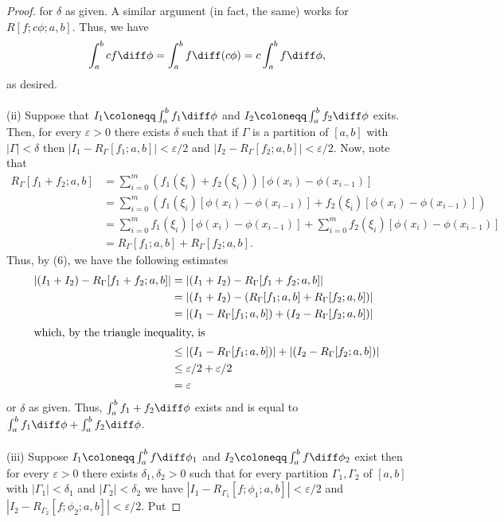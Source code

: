 \begin{proof}
for $\delta$ as given. A similar argument (in fact, the same) works for
$R[f;c\phi;a,b]$. Thus, we have
\[
\int_a^bcf\diff\phi=\int_a^bf\diff(c\phi)=c\int_a^bf\diff\phi,
\]
as desired.
\\\\
(ii) Suppose that $I_1\coloneqq \int_a^b f_1\diff\phi$ and
$I_2\coloneqq\int_a^b f_2\diff\phi$ exits. Then, for every $\varepsilon>0$
there exists $\delta$ such that if $\Gamma$ is a partition of $[a,b]$ with
$|\Gamma|<\delta$ then $\left|I_1-R_\Gamma[f_1;a,b]\right|<\varepsilon/2$
and $\left|I_2-R_\Gamma[f_2;a,b]\right|<\varepsilon/2$. Now, note that
\begin{align}
\label{eq:6}
R_\Gamma[f_1+f_2;a,b]
&=\sum_{i=0}^m(f_1(\xi_i)+f_2(\xi_i))\left[\phi(x_i)-\phi(x_{i-1})\right]\nonumber\\
&=\sum_{i=0}^m\left(f_1(\xi_i)\left[\phi(x_i)-\phi(x_{i-1})\right]
  +f_2(\xi_i)\left[\phi(x_i)-\phi(x_{i-1})\right]\right)\nonumber\\
&=\sum_{i=0}^mf_1(\xi_i)\left[\phi(x_i)-\phi(x_{i-1})\right]
  +\sum_{i=0}^mf_2(\xi_i)\left[\phi(x_i)-\phi(x_{i-1})\right]\nonumber\\
&=R_\Gamma[f_1;a,b]+R_\Gamma[f_2;a,b].
\end{align}
Thus, by (6), we have the following estimates
\begin{align*}
\left|(I_1+I_2)-R_\Gamma[f_1+f_2;a,b]\right|
&=\left|(I_1+I_2)-R_\Gamma[f_1+f_2;a,b]\right|\\
&=\left|(I_1+I_2)-(R_\Gamma[f_1;a,b]+R_\Gamma[f_2;a,b])\right|\\
&=\left|(I_1-R_\Gamma[f_1;a,b])+(I_2-R_\Gamma[f_2;a,b])\right|\\
\intertext{which, by the triangle inequality, is}
&\leq\left|(I_1-R_\Gamma[f_1;a,b])\right|+\left|(I_2-R_\Gamma[f_2;a,b])\right|\\
&\leq\varepsilon/2+\varepsilon/2\\
&=\varepsilon
\end{align*}
or $\delta$ as given. Thus, $\int_a^b f_1+f_2\diff\phi$ exists and is equal
to $\int_a^bf_1\diff\phi+\int_a^bf_2\diff\phi$.
\\\\
(iii) Suppose $I_1\coloneqq\int_a^bf\diff\phi_1$ and
$I_2\coloneqq\int_a^bf\diff\phi_2$ exist then for every $\varepsilon>0$
there exists $\delta_1,\delta_2>0$ such that for every partition
$\Gamma_1,\Gamma_2$ of $[a,b]$ with $|\Gamma_1|<\delta_1$ and
$|\Gamma_2|<\delta_2$ we have
$|I_1-R_{\Gamma_1}[f;\phi_1;a,b]|<\varepsilon/2$ and
$|I_2-R_{\Gamma_2}[f;\phi_2;a,b]|<\varepsilon/2$. Put

\end{proof}
